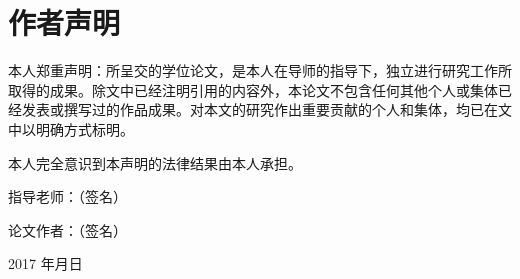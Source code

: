\chapter*{作者声明}
\thispagestyle{empty}
\vspace{2em}
本人郑重声明：所呈交的学位论文，是本人在导师的指导下，独立进行研究工作所取得的成果。除文中已经注明引用的内容外，本论文不包含任何其他个人或集体已经发表或撰写过的作品成果。对本文的研究作出重要贡献的个人和集体，均已在文中以明确方式标明。

本人完全意识到本声明的法律结果由本人承担。
\vspace{2em}
\large

\hfill 指导老师：\uline{\makebox[6em][l]{}}（签名）
\vspace{1em}

\hfill 论文作者：\uline{\makebox[6em][l]{}}（签名）
\vspace{1em}

\hfill 2017 年\qquad 月\qquad 日
\normalsize

\newpage
\thispagestyle{empty}